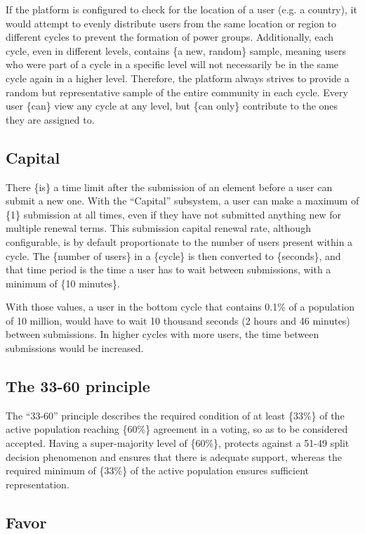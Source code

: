\documentclass[a4paper,11pt]{article}
\begin{document}
\begin{multicols}{2}
If the platform is configured to check for the location of a user (e.g. a country), it would attempt to evenly distribute users from the same location or region to different cycles to prevent the formation of power groups. Additionally, each cycle, even in different levels, contains \{a new, random\} sample, meaning users who were part of a cycle in a specific level will not necessarily be in the same cycle again in a higher level. Therefore, the platform always strives to provide a random but representative sample of the entire community in each cycle. Every user \{can\} view any cycle at any level, but \{can only\} contribute to the ones they are assigned to.

\subsection{Capital} \label{capital}

There \{is\} a time limit after the submission of an element before a user can submit a new one. With the “Capital” subsystem, a user can make a maximum of \{1\} submission at all times, even if they have not submitted anything new for multiple renewal terms. This submission capital renewal rate, although configurable, is by default proportionate to the number of users present within a cycle. The \{number of users\} in a \{cycle\} is then converted to \{seconds\}, and that time period is the time a user has to wait between submissions, with a minimum of \{10 minutes\}. 

With those values, a user in the bottom cycle that contains 0.1\% of a population of 10 million, would have to wait 10 thousand seconds (2 hours and 46 minutes) between submissions. In higher cycles with more users, the time between submissions would be increased.

\subsection{The 33-60 principle} \label{principle}

The ``33-60'' principle describes the required condition of at least \{33\%\} of the active population reaching \{60\%\} agreement in a voting, so as to be considered accepted. Having a super-majority level of \{60\%\}, protects against a 51-49 split decision phenomenon and ensures that there is adequate support, whereas the required minimum of \{33\%\} of the active population ensures sufficient representation.

\subsection{Favor} \label{favor}


\end{multicols}
\end{document}
